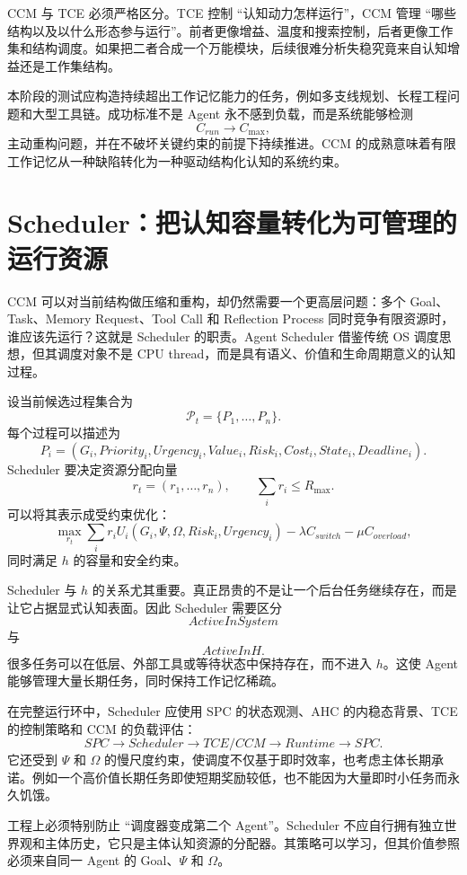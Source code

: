 CCM 与 TCE 必须严格区分。TCE 控制 ``认知动力怎样运行''，CCM 管理 ``哪些结构以及以什么形态参与运行''。前者更像增益、温度和搜索控制，后者更像工作集和结构调度。如果把二者合成一个万能模块，后续很难分析失稳究竟来自认知增益还是工作集结构。

本阶段的测试应构造持续超出工作记忆能力的任务，例如多支线规划、长程工程问题和大型工具链。成功标准不是 Agent 永不感到负载，而是系统能够检测
\[
C_{run}\rightarrow C_{\max},
\]
主动重构问题，并在不破坏关键约束的前提下持续推进。CCM 的成熟意味着有限工作记忆从一种缺陷转化为一种驱动结构化认知的系统约束。

\section{Scheduler：把认知容量转化为可管理的运行资源}

CCM 可以对当前结构做压缩和重构，却仍然需要一个更高层问题：多个 Goal、Task、Memory Request、Tool Call 和 Reflection Process 同时竞争有限资源时，谁应该先运行？这就是 Scheduler 的职责。Agent Scheduler 借鉴传统 OS 调度思想，但其调度对象不是 CPU thread，而是具有语义、价值和生命周期意义的认知过程。

设当前候选过程集合为
\[
\mathcal P_t
=
\{P_1,\ldots,P_n\}.
\]
每个过程可以描述为
\[
P_i
=
(
G_i,
Priority_i,
Urgency_i,
Value_i,
Risk_i,
Cost_i,
State_i,
Deadline_i
).
\]
Scheduler 要决定资源分配向量
\[
r_t
=
(r_1,\ldots,r_n),
\qquad
\sum_i r_i
\leq R_{\max}.
\]
可以将其表示成受约束优化：
\[
\max_{r_t}
\sum_i
r_i
U_i(
G_i,\Psi,\Omega,Risk_i,Urgency_i
)
-
\lambda C_{switch}
-
\mu C_{overload},
\]
同时满足 $h$ 的容量和安全约束。

Scheduler 与 $h$ 的关系尤其重要。真正昂贵的不是让一个后台任务继续存在，而是让它占据显式认知表面。因此 Scheduler 需要区分
\[
ActiveInSystem
\]
与
\[
ActiveInH.
\]
很多任务可以在低层、外部工具或等待状态中保持存在，而不进入 $h$。这使 Agent 能够管理大量长期任务，同时保持工作记忆稀疏。

在完整运行环中，Scheduler 应使用 SPC 的状态观测、AHC 的内稳态背景、TCE 的控制策略和 CCM 的负载评估：
\[
SPC
\rightarrow
Scheduler
\rightarrow
TCE/CCM
\rightarrow
Runtime
\rightarrow
SPC.
\]
它还受到 $\Psi$ 和 $\Omega$ 的慢尺度约束，使调度不仅基于即时效率，也考虑主体长期承诺。例如一个高价值长期任务即使短期奖励较低，也不能因为大量即时小任务而永久饥饿。

工程上必须特别防止 ``调度器变成第二个 Agent''。Scheduler 不应自行拥有独立世界观和主体历史，它只是主体认知资源的分配器。其策略可以学习，但其价值参照必须来自同一 Agent 的 Goal、$\Psi$ 和 $\Omega$。

